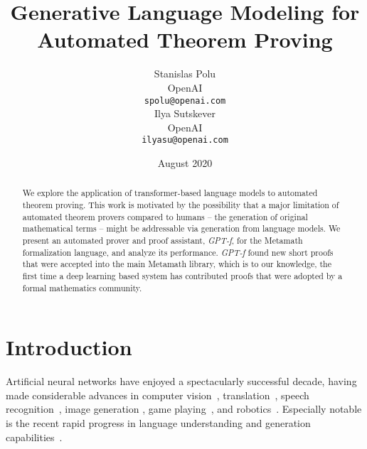 \documentclass{article}
\title{Generative Language Modeling for Automated Theorem Proving}
\author{
  Stanislas Polu \\
  OpenAI \\
  \texttt{spolu@openai.com} \\
  \And
  Ilya Sutskever \\
  OpenAI \\
  \texttt{ilyasu@openai.com} \\
}
\date{August 2020}
\begin{document}
\maketitle

\begin{abstract}
 We explore the application of transformer-based language models to automated theorem proving.  This work is motivated by the possibility that a major limitation of automated theorem provers compared to humans -- the generation of original mathematical terms -- might be addressable via generation from language models. We present an automated prover and proof assistant, \emph{GPT-f}, for the Metamath formalization language, and analyze its performance. \emph{GPT-f} found new short proofs that were accepted into the main Metamath library, which is to our knowledge, the first time a deep learning based system has contributed proofs that were adopted by a formal mathematics community.

\iffalse
  We explore the application of transformer-based language models to automated theorem proving. This work is motivated by the observation that formal systems support rapid verification of proofs but offer no way of generating the original mathematical terms that are necessary for proving challenging theorems. Conversely language models excel at generating such terms but are unable to verify the correctness of their predictions. We present an automated prover and proof assistant, \emph{GPT-f}, for the Metamath formalization language. Our automated prover produced new short proofs that were accepted into the main Metamath library, which is to our knowledge, the first time a deep learning based system has contributed proofs that were adopted by a formal mathematics community.
\fi
\end{abstract}

\section{Introduction}

Artificial neural networks have enjoyed a spectacularly successful decade, having made considerable advances in computer vision~\cite{krizhevsky2012imagenet,he2016deep}, translation~\cite{sutskever2014sequence,bahdanau2014neural,wu2016google}, speech recognition~\cite{graves2014towards,amodei2016deep}, image generation \cite{goodfellow2014generative,radford2015unsupervised,karras2017progressive,karras2019style,chen2020generative}, game playing~\cite{silver2016mastering,berner2019dota,vinyals2019grandmaster}, and robotics~\cite{akkaya2019solving,levine2016end}.  Especially notable is the recent rapid progress in language understanding and generation capabilities~\cite{vaswani2017attention,radford2018improving,radford2019language,brown2020language,devlin2018bert}. 
\end{document}

